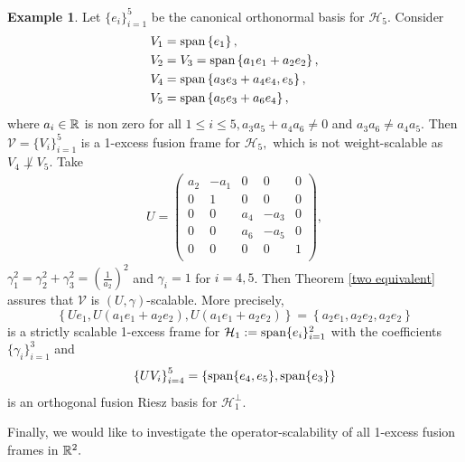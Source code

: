 \documentclass[sn-mathphys-num]{sn-jnl}%
\theoremstyle{definition}
\newtheorem{example}[theorem]{Example}
\theoremstyle{remark}
\numberwithin{equation}{section}
\begin{document}
\begin{example}
Let $\{e_{i}\}_{i=1}^{5}$ be the canonical orthonormal basis for $\mathcal {H}_{5}.$ Consider
\begin{align*}
V_{1}&=\textnormal{span}\left\lbrace e_{1}\right\rbrace ,
\\V_{2}&=V_{3}=\textnormal{span}\left\lbrace a_{1}e_{1}+a_{2}e_{2}\right\rbrace ,
\\V_{4}&=\textnormal{span}\left\lbrace a_{3}e_{3}+a_{4}e_{4},e_{5}\right\rbrace ,
\\V_{5}&=\textnormal{span}\left\lbrace a_{5}e_{3}+a_{6}e_{4}\right\rbrace ,
\end{align*}
where $a_{i}\in \Bbb R$ is non zero for all  $1\leq i \leq 5, a_{3}a_{5}+a_{4}a_{6}\neq 0 $ and $a_{3}a_{6}\neq a_{4}a_{5}$. Then $\mathcal{V}=\{V_{i}\}_{i=1}^5$ is a 1-excess fusion frame for $\mathcal {H}_{5},$ which is not weight-scalable as $V_{4}\not\perp V_{5}$. Take
\begin{align*}
U=\begin{pmatrix}
    a_{2}  & -a_{1} & 0  & 0 & 0 \\
    0  & 1  & 0  &  0  & 0  \\
    0  & 0  & a_{4}  & -a_{3} & 0 \\
    0  & 0  & a_{6} &  -a_{5}  & 0 \\
    0  & 0  & 0  & 0 & 1 \\
\end{pmatrix}, 
\end{align*} 
$\gamma_{1}^2=\gamma_{2}^2+\gamma_{3}^2=\left( \frac{1}{a_{2}}\right)^2 $ and $\gamma_{i}=1$ for $i=4,5$. Then Theorem \ref{two equivalent} assures that $\mathcal{V}$ is $(U,\gamma)$-scalable. More precisely, 
\begin{equation*}
\left\lbrace Ue_{1},U(a_{1}e_{1}+a_{2}e_{2}),U(a_{1}e_{1}+a_{2}e_{2})\right\rbrace =\left\lbrace a_{2}e_{1},a_{2}e_{2},a_{2}e_{2}\right\rbrace 
\end{equation*}
is a strictly scalable 1-excess frame for $\mathcal{H}_{1}:=\textnormal{span}\{e_{i}\}_{i=1}^{2}$ with the coefficients $\{\gamma_{i}\}_{i=1}^{3}$ and 
\begin{equation*}
\left\lbrace UV_{i}\right\rbrace _{i=4}^{5}=\left\lbrace \textnormal{span}\{e_{4},e_{5}\},\textnormal{span}\{e_{3}\} \right\rbrace 
\end{equation*}
is an orthogonal fusion Riesz basis for $\mathcal{H}_{1}^{\perp}$.
\end{example}

Finally, we would like to investigate the operator-scalability of all 1-excess fusion frames in $\Bbb R^2.$
\end{document}
